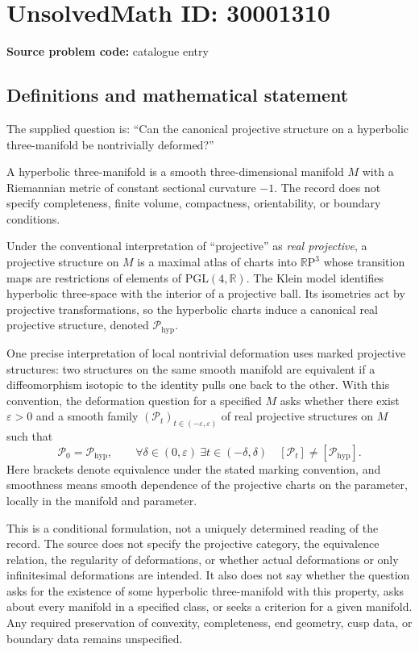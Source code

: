 \documentclass[11pt]{article}
\newcommand{\R}{\mathbb{R}}
\begin{document}
\section*{UnsolvedMath ID: 30001310}
\textbf{Source problem code:} catalogue entry
\subsection{Definitions and mathematical statement}
The supplied question is: ``Can the canonical projective structure on a hyperbolic three-manifold be nontrivially deformed?''

A hyperbolic three-manifold is a smooth three-dimensional manifold \(M\) with a Riemannian metric of constant sectional curvature \(-1\). The record does not specify completeness, finite volume, compactness, orientability, or boundary conditions.

Under the conventional interpretation of ``projective'' as \emph{real projective}, a projective structure on \(M\) is a maximal atlas of charts into \(\R\mathrm{P}^{3}\) whose transition maps are restrictions of elements of \(\mathrm{PGL}(4,\R)\). The Klein model identifies hyperbolic three-space with the interior of a projective ball. Its isometries act by projective transformations, so the hyperbolic charts induce a canonical real projective structure, denoted \(\mathcal P_{\mathrm{hyp}}\).

One precise interpretation of local nontrivial deformation uses marked projective structures: two structures on the same smooth manifold are equivalent if a diffeomorphism isotopic to the identity pulls one back to the other. With this convention, the deformation question for a specified \(M\) asks whether there exist \(\varepsilon>0\) and a smooth family \((\mathcal P_t)_{t\in(-\varepsilon,\varepsilon)}\) of real projective structures on \(M\) such that
\[
\mathcal P_0=\mathcal P_{\mathrm{hyp}},
\qquad
\forall\delta\in(0,\varepsilon)\ \exists t\in(-\delta,\delta)
\quad [\mathcal P_t]\ne[\mathcal P_{\mathrm{hyp}}].
\]
Here brackets denote equivalence under the stated marking convention, and smoothness means smooth dependence of the projective charts on the parameter, locally in the manifold and parameter.

This is a conditional formulation, not a uniquely determined reading of the record. The source does not specify the projective category, the equivalence relation, the regularity of deformations, or whether actual deformations or only infinitesimal deformations are intended. It also does not say whether the question asks for the existence of some hyperbolic three-manifold with this property, asks about every manifold in a specified class, or seeks a criterion for a given manifold. Any required preservation of convexity, completeness, end geometry, cusp data, or boundary data remains unspecified.
\end{document}
